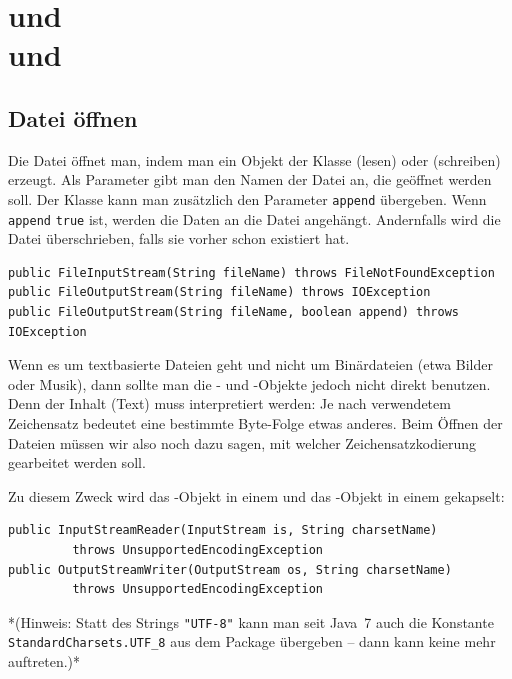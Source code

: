 \section{ und \\
 und }

\subsection{Datei öffnen}

Die Datei öffnet man, indem man ein Objekt der Klasse 
(lesen) oder  (schreiben) erzeugt. Als Parameter gibt
man den Namen der Datei an, die geöffnet werden soll. Der Klasse
 kann man zusätzlich den Parameter \lstinline|append|
übergeben. Wenn \lstinline|append| \lstinline|true| ist, werden die Daten an die
Datei angehängt. Andernfalls wird die Datei überschrieben, falls sie
vorher schon existiert hat.

\begin{lstlisting}
public FileInputStream(String fileName) throws FileNotFoundException
public FileOutputStream(String fileName) throws IOException
public FileOutputStream(String fileName, boolean append) throws IOException
\end{lstlisting}

Wenn es um textbasierte Dateien geht und nicht um Binärdateien (etwa Bilder
oder Musik), dann sollte man die - und
-Objekte jedoch nicht direkt benutzen. Denn der Inhalt
(Text) muss interpretiert werden: Je nach verwendetem Zeichensatz bedeutet eine
bestimmte Byte-Folge etwas anderes. Beim Öffnen der Dateien müssen wir also noch
dazu sagen, mit welcher Zeichensatzkodierung gearbeitet werden soll.

Zu diesem Zweck wird das -Objekt in einem
 und das -Objekt in einem
 gekapselt:

\begin{lstlisting}
public InputStreamReader(InputStream is, String charsetName) 
         throws UnsupportedEncodingException
public OutputStreamWriter(OutputStream os, String charsetName) 
         throws UnsupportedEncodingException
\end{lstlisting}

*(Hinweis: Statt des Strings \lstinline|"UTF-8"| kann man seit Java~7 auch
die Konstante \lstinline|StandardCharsets.UTF_8| aus dem Package
 übergeben -- dann kann keine
 mehr auftreten.)*

